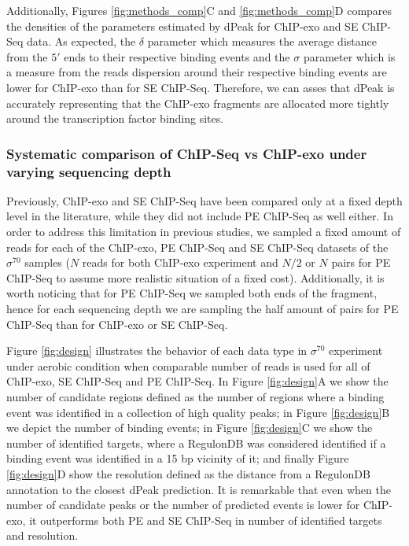 \documentclass{bmcart}
\newcommand{\sig}{\sigma^{70}}
\begin{document}
Additionally, Figures \ref{fig:methods_comp}C and
\ref{fig:methods_comp}D compares the densities of the parameters
estimated by dPeak for ChIP-exo and SE ChIP-Seq data. As expected, the
$\delta$ parameter which measures the average distance from the
$5\prime$ ends to their respective binding events and the $\sigma$
parameter which is a measure from the reads dispersion around their
respective binding events are lower for ChIP-exo than for SE
ChIP-Seq. Therefore, we can asses that dPeak is accurately
representing that the ChIP-exo fragments are allocated more tightly
around the transcription factor binding sites.

\subsubsection*{Systematic comparison of ChIP-Seq vs ChIP-exo under
  varying sequencing depth}

Previously, ChIP-exo and SE ChIP-Seq have been compared only at a
fixed depth level in the literature, while they did not include PE
ChIP-Seq as well either. In order to address this limitation in
previous studies, we sampled a fixed amount of reads for each of the
ChIP-exo, PE ChIP-Seq and SE ChIP-Seq datasets of the $\sig$ samples
($N$ reads for both ChIP-exo experiment and $N/2$ or $N$ pairs for PE
ChIP-Seq to assume more realistic situation of a fixed
cost). Additionally, it is worth noticing that for PE ChIP-Seq we
sampled both ends of the fragment, hence for each sequencing depth we
are sampling the half amount of pairs for PE ChIP-Seq than for
ChIP-exo or SE ChIP-Seq.

Figure \ref{fig:design} illustrates the behavior of each data type in
$\sig$ experiment under aerobic condition when comparable number of
reads is used for all of ChIP-exo, SE ChIP-Seq and PE ChIP-Seq. In
Figure \ref{fig:design}A we show the number of candidate regions
defined as the number of regions where a binding event was identified
in a collection of high quality peaks; in Figure \ref{fig:design}B we
depict the number of binding events; in Figure \ref{fig:design}C we
show the number of identified targets, where a RegulonDB was
considered identified if a binding event was identified in a 15 bp
vicinity of it; and finally Figure \ref{fig:design}D show the
resolution defined as the distance from a RegulonDB annotation to the
closest dPeak prediction. It is remarkable that even when the number
of candidate peaks or the number of predicted events is lower for
ChIP-exo, it outperforms both PE and SE ChIP-Seq in number of
identified targets and resolution.
\end{document}
